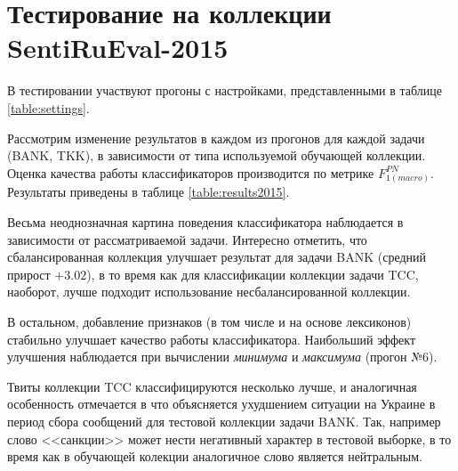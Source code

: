 \section{Тестирование на коллекции SentiRuEval-2015}
\label{sec:sentirueval2015}

В тестировании участвуют прогоны с настройками, представленными в таблице
\ref{table:settings}.



Рассмотрим изменение результатов в каждом из прогонов для каждой задачи
(BANK, TKK), в зависимости от типа используемой обучающей коллекции.
Оценка качества работы классификаторов производится по метрике
$F_{1(macro)}^{PN}$.
Результаты приведены в таблице
\ref{table:results2015}.



Весьма неоднозначная картина поведения классификатора наблюдается в зависимости
от рассматриваемой задачи.
Интересно отметить, что сбалансированная коллекция улучшает результат для
задачи BANK (средний прирост $+3.02$), в то время как для классификации
коллекции задачи TCC, наоборот, лучше подходит использование несбалансированной
коллекции.

В остальном, добавление признаков (в том числе и на основе лексиконов)
стабильно улучшает качество работы классификатора.
Наибольший эффект улучшения наблюдается при вычислении
{\it минимума } и {\it максимума} (прогон №6).

Твиты коллекции TCC классифицируются несколько лучше, и аналогичная особенность
отмечается в \cite{tonalityAnalysis} что объясняется ухудшением ситуации на
Украине в период сбора сообщений для тестовой коллекции задачи BANK.
Так, например слово <<санкции>> может нести негативный характер в тестовой
выборке, в то время как в обучающей колекции аналогичное слово является
нейтральным.
